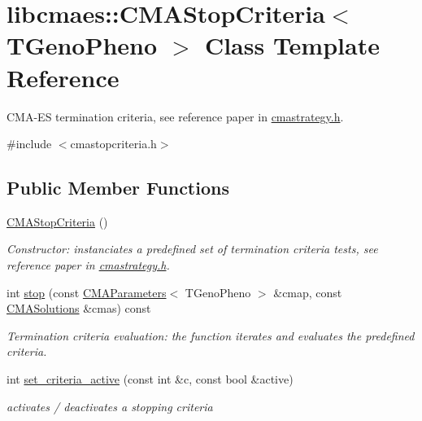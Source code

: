 \hypertarget{classlibcmaes_1_1CMAStopCriteria}{\section{libcmaes\+:\+:C\+M\+A\+Stop\+Criteria$<$ T\+Geno\+Pheno $>$ Class Template Reference}
\label{classlibcmaes_1_1CMAStopCriteria}
}


C\+M\+A-\/\+E\+S termination criteria, see reference paper in \hyperlink{cmastrategy_8h_source}{cmastrategy.\+h}.  




{\ttfamily \#include $<$cmastopcriteria.\+h$>$}

\subsection*{Public Member Functions}
\begin{DoxyCompactItemize}
\item 
\hypertarget{classlibcmaes_1_1CMAStopCriteria_a8b7795af41cba9122799e221d3b95b7b}{\hyperlink{classlibcmaes_1_1CMAStopCriteria_a8b7795af41cba9122799e221d3b95b7b}{C\+M\+A\+Stop\+Criteria} ()}\label{classlibcmaes_1_1CMAStopCriteria_a8b7795af41cba9122799e221d3b95b7b}

\begin{DoxyCompactList}\small\item\em Constructor\+: instanciates a predefined set of termination criteria tests, see reference paper in \hyperlink{cmastrategy_8h_source}{cmastrategy.\+h}. \end{DoxyCompactList}\item 
int \hyperlink{classlibcmaes_1_1CMAStopCriteria_a6049e6ee663be2aa8781e9bd3cf9cba8}{stop} (const \hyperlink{classlibcmaes_1_1CMAParameters}{C\+M\+A\+Parameters}$<$ T\+Geno\+Pheno $>$ \&cmap, const \hyperlink{classlibcmaes_1_1CMASolutions}{C\+M\+A\+Solutions} \&cmas) const 
\begin{DoxyCompactList}\small\item\em Termination criteria evaluation\+: the function iterates and evaluates the predefined criteria. \end{DoxyCompactList}\item 
int \hyperlink{classlibcmaes_1_1CMAStopCriteria_a3c49ee85e48d2104fc47eb5fe0886f55}{set\+\_\+criteria\+\_\+active} (const int \&c, const bool \&active)
\begin{DoxyCompactList}\small\item\em activates / deactivates a stopping criteria \end{DoxyCompactList}\end{DoxyCompactItemize}
